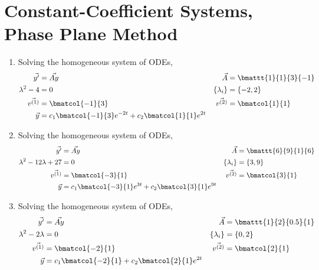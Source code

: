 \section{Constant-Coefficient Systems, Phase Plane Method}
\begin{enumerate}
    \item Solving the homogeneous system of ODEs,
          \begin{align}
              \vec{y'}        & = \vec{Ay}                   &
              \vec{A}         & = \bmattt{1}{1}{3}{-1}         \\
              \lambda^{2} - 4 & = 0                          &
              \{\lambda_i\}   & = \{-2, 2\}                    \\
              \vec{v^{(1)}}   & = \bmatcol{-1}{3}            &
              \vec{v^{(2)}}   & = \bmatcol{1}{1}               \\
              \vec{y}         & = c_1 \bmatcol{-1}{3}e^{-2t}
              + c_2 \bmatcol{1}{1} e^{2t}
          \end{align}

    \item Solving the homogeneous system of ODEs,
          \begin{align}
              \vec{y'}                     & = \vec{Ay}                  &
              \vec{A}                      & = \bmattt{6}{9}{1}{6}         \\
              \lambda^{2} - 12\lambda + 27 & = 0                         &
              \{\lambda_i\}                & = \{3, 9\}                    \\
              \vec{v^{(1)}}                & = \bmatcol{-3}{1}           &
              \vec{v^{(2)}}                & = \bmatcol{3}{1}              \\
              \vec{y}                      & = c_1 \bmatcol{-3}{1}e^{3t}
              + c_2 \bmatcol{3}{1} e^{9t}
          \end{align}

    \item Solving the homogeneous system of ODEs,
          \begin{align}
              \vec{y'}               & = \vec{Ay}              &
              \vec{A}                & = \bmattt{1}{2}{0.5}{1}   \\
              \lambda^{2} - 2\lambda & = 0                     &
              \{\lambda_i\}          & = \{0, 2\}                \\
              \vec{v^{(1)}}          & = \bmatcol{-2}{1}       &
              \vec{v^{(2)}}          & = \bmatcol{2}{1}          \\
              \vec{y}                & = c_1 \bmatcol{-2}{1}
              + c_2 \bmatcol{2}{1} e^{2t}
          \end{align}


\end{enumerate}
